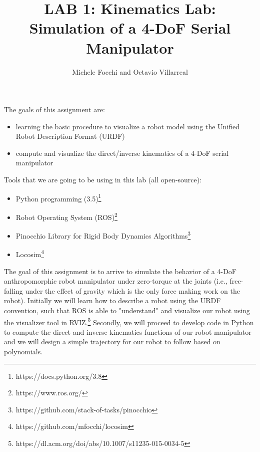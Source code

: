 \documentclass[11pt]{article}
\title{LAB 1: Kinematics Lab: Simulation of a 4-DoF Serial Manipulator}
\author{Michele Focchi and Octavio Villarreal}
\date{}
\begin{document}
\maketitle
\noindent
The goals of this assignment are:
\begin{itemize}
    \item learning the basic procedure to visualize a robot model using the Unified Robot Description Format (URDF)
    \item compute and visualize the direct/inverse kinematics of a 4-DoF serial manipulator 
\end{itemize}

\noindent
Tools that we are going to be using in this lab (all open-source):
\begin{itemize}
	\item Python programming (3.5)\footnote{https://docs.python.org/3.8}
	\item Robot Operating System (ROS)\footnote{https://www.ros.org/}
	\item Pinocchio Library for Rigid Body Dynamics Algorithms\footnote{https://github.com/stack-of-tasks/pinocchio}
	\item Locosim\footnote{https://github.com/mfocchi/locosim}
\end{itemize}
%
%
The goal of this assignment is to arrive to simulate the behavior of a 4-DoF anthropomorphic robot manipulator under zero-torque at the joints (i.e., free-falling under the effect of gravity which is the only force making work on the robot). Initially we will learn how to describe a robot using the URDF convention, such that ROS is able to "understand" and visualize our robot using the visualizer tool in RVIZ.\footnote{https://dl.acm.org/doi/abs/10.1007/s11235-015-0034-5} Secondly, we will proceed to develop code in Python to compute the direct and inverse kinematics functions of  our robot manipulator and we will design a simple trajectory for our robot to follow based on polynomials. 


\end{document}
